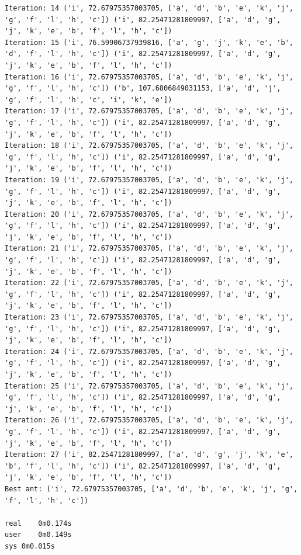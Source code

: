 \documentclass[11pt]{article}
\begin{document}
\begin{lstlisting}
Iteration: 14 ('i', 72.67975357003705, ['a', 'd', 'b', 'e', 'k', 'j', 'g', 'f', 'l', 'h', 'c']) ('i', 82.25471281809997, ['a', 'd', 'g', 'j', 'k', 'e', 'b', 'f', 'l', 'h', 'c'])
Iteration: 15 ('i', 76.59906737939816, ['a', 'g', 'j', 'k', 'e', 'b', 'd', 'f', 'l', 'h', 'c']) ('i', 82.25471281809997, ['a', 'd', 'g', 'j', 'k', 'e', 'b', 'f', 'l', 'h', 'c'])
Iteration: 16 ('i', 72.67975357003705, ['a', 'd', 'b', 'e', 'k', 'j', 'g', 'f', 'l', 'h', 'c']) ('b', 107.6806849031153, ['a', 'd', 'j', 'g', 'f', 'l', 'h', 'c', 'i', 'k', 'e'])
Iteration: 17 ('i', 72.67975357003705, ['a', 'd', 'b', 'e', 'k', 'j', 'g', 'f', 'l', 'h', 'c']) ('i', 82.25471281809997, ['a', 'd', 'g', 'j', 'k', 'e', 'b', 'f', 'l', 'h', 'c'])
Iteration: 18 ('i', 72.67975357003705, ['a', 'd', 'b', 'e', 'k', 'j', 'g', 'f', 'l', 'h', 'c']) ('i', 82.25471281809997, ['a', 'd', 'g', 'j', 'k', 'e', 'b', 'f', 'l', 'h', 'c'])
Iteration: 19 ('i', 72.67975357003705, ['a', 'd', 'b', 'e', 'k', 'j', 'g', 'f', 'l', 'h', 'c']) ('i', 82.25471281809997, ['a', 'd', 'g', 'j', 'k', 'e', 'b', 'f', 'l', 'h', 'c'])
Iteration: 20 ('i', 72.67975357003705, ['a', 'd', 'b', 'e', 'k', 'j', 'g', 'f', 'l', 'h', 'c']) ('i', 82.25471281809997, ['a', 'd', 'g', 'j', 'k', 'e', 'b', 'f', 'l', 'h', 'c'])
Iteration: 21 ('i', 72.67975357003705, ['a', 'd', 'b', 'e', 'k', 'j', 'g', 'f', 'l', 'h', 'c']) ('i', 82.25471281809997, ['a', 'd', 'g', 'j', 'k', 'e', 'b', 'f', 'l', 'h', 'c'])
Iteration: 22 ('i', 72.67975357003705, ['a', 'd', 'b', 'e', 'k', 'j', 'g', 'f', 'l', 'h', 'c']) ('i', 82.25471281809997, ['a', 'd', 'g', 'j', 'k', 'e', 'b', 'f', 'l', 'h', 'c'])
Iteration: 23 ('i', 72.67975357003705, ['a', 'd', 'b', 'e', 'k', 'j', 'g', 'f', 'l', 'h', 'c']) ('i', 82.25471281809997, ['a', 'd', 'g', 'j', 'k', 'e', 'b', 'f', 'l', 'h', 'c'])
Iteration: 24 ('i', 72.67975357003705, ['a', 'd', 'b', 'e', 'k', 'j', 'g', 'f', 'l', 'h', 'c']) ('i', 82.25471281809997, ['a', 'd', 'g', 'j', 'k', 'e', 'b', 'f', 'l', 'h', 'c'])
Iteration: 25 ('i', 72.67975357003705, ['a', 'd', 'b', 'e', 'k', 'j', 'g', 'f', 'l', 'h', 'c']) ('i', 82.25471281809997, ['a', 'd', 'g', 'j', 'k', 'e', 'b', 'f', 'l', 'h', 'c'])
Iteration: 26 ('i', 72.67975357003705, ['a', 'd', 'b', 'e', 'k', 'j', 'g', 'f', 'l', 'h', 'c']) ('i', 82.25471281809997, ['a', 'd', 'g', 'j', 'k', 'e', 'b', 'f', 'l', 'h', 'c'])
Iteration: 27 ('i', 82.25471281809997, ['a', 'd', 'g', 'j', 'k', 'e', 'b', 'f', 'l', 'h', 'c']) ('i', 82.25471281809997, ['a', 'd', 'g', 'j', 'k', 'e', 'b', 'f', 'l', 'h', 'c'])
Best ant: ('i', 72.67975357003705, ['a', 'd', 'b', 'e', 'k', 'j', 'g', 'f', 'l', 'h', 'c'])

real	0m0.174s
user	0m0.149s
sys	0m0.015s
\end{lstlisting}
\end{document}
